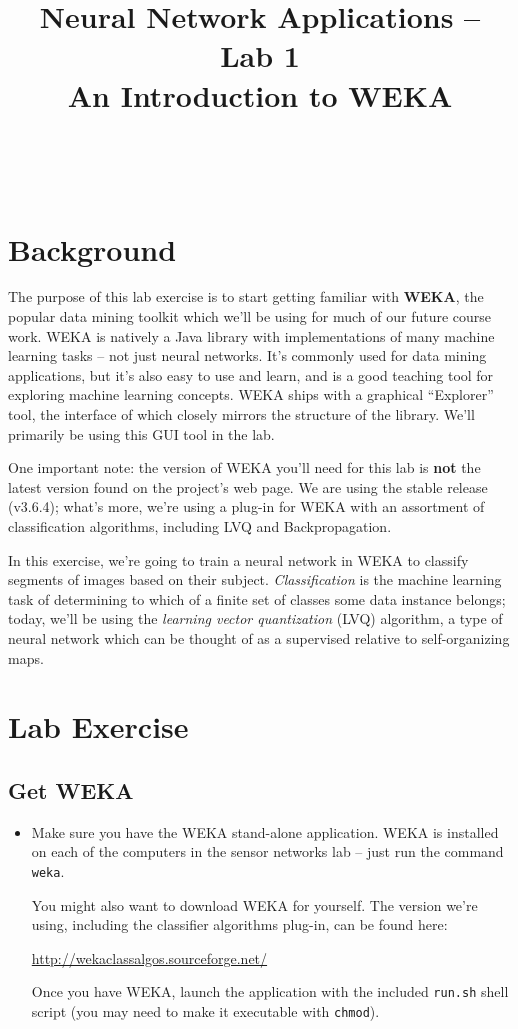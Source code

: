 \documentclass[11pt]{cselabheader}
\title{Neural Network Applications -- Lab 1 \\ An Introduction to WEKA}
\begin{document}
\maketitle

\horrule{0.5pt}\\\horrule{2pt}

\section{Background}
The purpose of this lab exercise is to start getting familiar with \textbf{WEKA}, the popular data mining toolkit which we'll be using for much of our future course work. WEKA is natively a Java library with implementations of many machine learning tasks -- not just neural networks. It's commonly used for data mining applications, but it's also easy to use and learn, and is a good teaching tool for exploring machine learning concepts. WEKA ships with a graphical ``Explorer'' tool, the interface of which closely mirrors the structure of the library. We'll primarily be using this GUI tool in the lab.

One important note: the version of WEKA you'll need for this lab is \textbf{not} the latest version found on the project's web page. We are using the stable release (v3.6.4); what's more, we're using a plug-in for WEKA with an assortment of classification algorithms, including LVQ and Backpropagation.

In this exercise, we're going to train a neural network in WEKA to classify segments of images based on their subject. \textit{Classification} is the machine learning task of determining to which of a finite set of classes some data instance belongs; today, we'll be using the \textit{learning vector quantization} (LVQ) algorithm, a type of neural network which can be thought of as a supervised relative to self-organizing maps.

\section{Lab Exercise}

\subsection{Get WEKA}

\begin{itemize}[leftmargin=*]

\item Make sure you have the WEKA stand-alone application. WEKA is installed on each of the computers in the sensor networks lab -- just run the command \texttt{weka}.

You might also want to download WEKA for yourself. The version we're using, including the classifier algorithms plug-in, can be found here:
\begin{center}
  \url{http://wekaclassalgos.sourceforge.net/}
\end{center}
Once you have WEKA, launch the application with the included \texttt{run.sh} shell script (you may need to make it executable with \texttt{chmod}).

\end{itemize}
\end{document}
